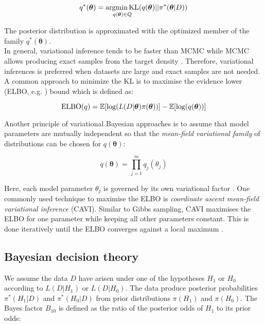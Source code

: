 \begin{equation}
q^\ast(\bm{\theta})=\underset{q(\bm{\theta})\in{}Q}{\textnormal{argmin\,{}KL}}(q(\bm{\theta})||\pi^*(\bm{\theta}|D))
\end{equation}

The posterior distribution is approximated with the optimized member of the family $q^\ast(\bm{\theta})$\citep{Blei2017}.\\
In general, variational inference tends to be faster than MCMC while MCMC allows producing exact samples from the target density \citep{Blei2017}. Therefore, variational inferences is preferred when datasets are large and exact samples are not needed. A common approach to minimize the KL is to maximise the evidence lower (ELBO, e.g. \citep{Beal2003}) bound which is defined as:

\begin{equation}
\textnormal{ELBO}(q)=\mathbb{E}[\log(L(D|\bm{\theta})\pi(\bm{\theta}))] - \mathbb{E}[\log(q(\bm{\theta}))]
\end{equation}

Another principle of variational Bayesian approaches is to assume that model parameters are mutually independent so that the \emph{mean-field variational family} of distributions can be chosen for $q(\bm{\theta})$:

\begin{equation}
q(\bm{\theta})=\prod_{j=1}^m{}q_j(\theta_j)
\end{equation}

Here, each model parameter $\theta_j$ is governed by its own variational factor \citep{Blei2017}. One commonly used technique to maximise the ELBO is \emph{coordinate ascent mean-field variational inference} (CAVI). Similar to Gibbs sampling, CAVI maximises the ELBO for one parameter while keeping all other parameters constant. This is done iteratively until the ELBO converges against a local maximum \citep{Blei2017}. 

\subsection{Bayesian decision theory} \label{sec0:decision}

We assume the data $D$ have arisen under one of the hypotheses $H_1$ or $H_0$ according to $L(D|H_1)$ or $L(D|H_0)$. The data produce posterior probabilities $\pi^*(H_1|D)$ and $\pi^*(H_0|D)$ from prior distributions $\pi(H_1)$ and $\pi(H_0)$. The Bayes factor $B_{10}$ \citep{Jeffreys1961} is defined as the ratio of the posterior odds of $H_1$ to its prior odds:

